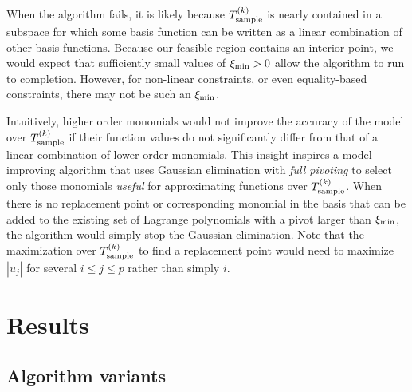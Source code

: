 \documentclass{article}
\begin{document}

When the algorithm fails, it is likely because ${T_{\text{sample}}^{(k)}}$ is nearly contained in a subspace 
for which some basis function can be written as a linear combination of other basis functions.
Because our feasible region contains an interior point, we would expect that sufficiently small values of $\xi_{\text{min}}>0$ allow the algorithm to run to completion.
However, for non-linear constraints, or even equality-based constraints, there may not be such an $\xi_{\text{min}}$.

Intuitively, higher order monomials would not improve the accuracy of the model over ${T_{\text{sample}}^{(k)}}$ 
if their function values do not significantly differ from that of a linear combination of lower order monomials.
This insight inspires a model improving algorithm that uses Gaussian elimination with {\em full pivoting}
to select only those monomials {\em useful} for approximating functions over ${T_{\text{sample}}^{(k)}}$.
When there is no replacement point or corresponding monomial in the basis that can be added to the existing set of Lagrange polynomials with a pivot larger than $\xi_{\text{min}}$,
the algorithm would simply stop the Gaussian elimination.
Note that the maximization over ${T_{\text{sample}}^{(k)}}$ to find a replacement point would need to maximize $|u_j|$ for several $i \le j \le p$ rather than simply $i$.


\section{Results}

\subsection{Algorithm variants}
\end{document}
